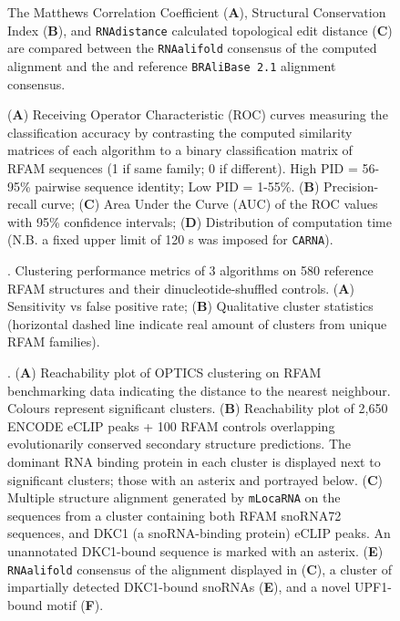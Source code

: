\documentclass{bmcart}
\newcommand\bralibase{\texttt{BRAliBase 2.1}}
\newcommand\carna{\texttt{CARNA}}
\newcommand\rnaalifold{\texttt{RNAalifold}}
\begin{document}
\begin{backmatter}
\begin{figure}[h!]
 \caption {  The
 Matthews Correlation Coefficient (\textbf{A}), Structural Conservation Index  
 (\textbf{B}), and \texttt{RNAdistance} calculated topological edit distance 
 (\textbf{C}) are compared between the \rnaalifold{} consensus of the computed 
 alignment and the and reference \bralibase{} alignment consensus.  }
\end{figure}


\begin{figure}[h!]
 \caption {
 (\textbf{A}) Receiving Operator Characteristic (ROC) curves measuring the classification
 accuracy by contrasting the computed similarity matrices of each algorithm 
 to a binary classification matrix of RFAM  sequences (1 if same family; 
 0 if different). High PID =  56-95\% pairwise sequence identity; Low PID  = 1-55\%.
 (\textbf{B}) Precision-recall curve;  
 (\textbf{C}) Area Under the Curve (AUC) of the ROC values with 95\% confidence intervals; 
 (\textbf{D}) Distribution of computation time (N.B. a fixed upper limit of 120 s was 
 imposed for \carna{}). }
\end{figure}


\begin{figure}[h!]
 \caption {. Clustering performance metrics of 3 algorithms on 580 reference RFAM 
 structures and their dinucleotide-shuffled controls. (\textbf{A}) Sensitivity vs false positive rate; (\textbf{B}) Qualitative cluster statistics (horizontal dashed line indicate real amount of clusters from unique RFAM families). }
\end{figure}


\begin{figure}[h!]
 \caption {. 
 (\textbf{A}) Reachability plot of OPTICS clustering on RFAM benchmarking data indicating the distance to the nearest neighbour. Colours represent 
 significant clusters. 
 (\textbf{B}) Reachability plot of 2,650 ENCODE eCLIP peaks + 100 RFAM controls overlapping evolutionarily conserved secondary structure predictions. The dominant RNA binding protein 
 in each cluster is displayed next to significant clusters; those with an asterix and portrayed below.
 (\textbf{C}) Multiple structure alignment generated by \texttt{mLocaRNA} on the sequences from a 
 cluster containing both RFAM snoRNA72 sequences, and DKC1 (a snoRNA-binding protein) eCLIP peaks. 
An unannotated DKC1-bound sequence is marked with an asterix.
(\textbf{E}) \texttt{RNAalifold} consensus of the alignment displayed in (\textbf{C}), 
a cluster of impartially detected DKC1-bound snoRNAs (\textbf{E}), 
and a novel UPF1-bound motif (\textbf{F}). }
\end{figure}



\end{backmatter}
\end{document}
